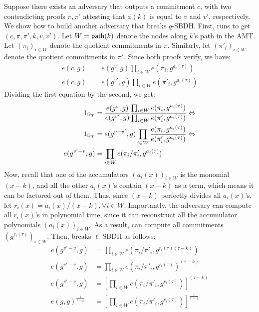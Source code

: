 Suppose there exists an adversary \Adv that outputs a commitment $c$, with two contradicting proofs $\pi, \pi'$ attesting that $\phi(k)$ is equal to $v$ and $v'$, respectively.
We show how to build another adversary \AdvB that breaks $q$-SBDH.
First, \AdvB runs \Adv to get $(c, \pi, \pi', k, v, v')$.
Let $W=\mathsf{path}(k)$ denote the nodes along $k$'s path in the AMT.
Let $(\pi_i)_{i\in W}$ denote the quotient commitments in $\pi$.
Similarly, let $(\pi'_i)_{i\in W}$ denote the quotient commitments in $\pi'$.
Since both proofs verify, we have:
\begin{align*}
e(c, g) &= e(g^{v}, g) \prod_{i\in W} {e(\pi_i, g^{a_i(\tau)})}\\
e(c, g) &= e(g^{v'}, g) \prod_{i \in W} {e(\pi'_i, g^{a_i(\tau)})}
\end{align*}
Dividing the first equation by the second, we get:
\begin{align*}
1_{\mathbb{G}_T} &= \frac{e(g^{v}, g)}{e(g^{v'}, g)} \frac{\prod_{i \in W} {e(\pi_i, g^{a_i(\tau)})}} {\prod_{i \in W} {e(\pi'_i, g^{a_i(\tau)})}}\Leftrightarrow\\
1_{\mathbb{G}_T} &= {e(g^{v-v'}, g)} \prod_{i \in W} \frac{e(\pi_i, g^{a_i(\tau)})}{e(\pi'_i, g^{a_i(\tau)})} \Leftrightarrow\\
e(g^{v'-v}, g) &= \prod_{i \in W} e(\pi_i / \pi'_i, g^{a_i(\tau)})
\end{align*}
Now, recall that one of the accumulators $(a_i(x))_{i\in W}$ is the monomial $(x - k)$, and all the other $a_i(x)$'s contain $(x-k)$ as a term, which means it can be factored out of them.
Thus, since $(x-k)$ perfectly divides all $a_i(x)$'s, let $r_i(x) = a_i(x) / (x-k), \forall i\in W$.
Importantly, the adversary \AdvB can compute all $r_i(x)$'s in polynomial time, since it can reconstruct all the accumulator polynomials $(a_i(x))_{i\in W}$.
As a result, \AdvB can compute all commitments $(g^{r_i(\tau)})_{i \in W}$.
Then, \AdvB breaks $\ell$-SBDH as follows:
\begin{align*}
e(g^{v'-v}, g) &= \prod_{i\in W} {e(\pi_i / \pi'_i, g^{r_i(\tau)(\tau-k)})}\\
e(g^{v'-v}, g) &= \prod_{i\in W} {e(\pi_i / \pi'_i, g^{r_i(\tau)})^{(\tau-k)}}\\
e(g^{v'-v}, g) &= \left[\prod_{i\in W} {e(\pi_i / \pi'_i, g^{r_i(\tau)})}\right]^{(\tau-k)}\\
e(g, g)^{\frac{1}{\tau-k}} &= \left[\prod_{i\in W} {e(\pi_i / \pi'_i, g^{r_i(\tau)})}\right]^{\frac{1}{v'-v}}
\end{align*}
